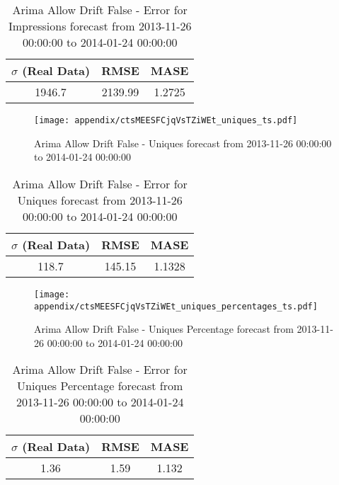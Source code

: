 \begin{table}[H]
\centering
\footnotesize
\begin{tabular}{ccc}
$\sigma$ (Real Data) & RMSE & MASE   \\ \hline
1946.7 & 2139.99 & 1.2725 \\
\end{tabular}

\vspace{0.5cm}

\caption[]{
Arima Allow Drift False - Error for Impressions forecast from 2013-11-26 00:00:00 to 2014-01-24 00:00:00}
\end{table}

\begin{figure}[H] \begin{center} \leavevmode
\texttt{[image: appendix/ctsMEESFCjqVsTZiWEt\_uniques\_ts.pdf]} \caption[]{
Arima Allow Drift False - Uniques forecast from 2013-11-26 00:00:00 to 2014-01-24 00:00:00} \label{fig:appendix/ctsMEESFCjqVsTZiWEt_uniques_ts.pdf} \end{center}
\end{figure}

\begin{table}[H]
\centering
\footnotesize
\begin{tabular}{ccc}
$\sigma$ (Real Data) & RMSE & MASE   \\ \hline
118.7 & 145.15 & 1.1328 \\
\end{tabular}

\vspace{0.5cm}

\caption[]{
Arima Allow Drift False - Error for Uniques forecast from 2013-11-26 00:00:00 to 2014-01-24 00:00:00}
\end{table}

\begin{figure}[H] \begin{center} \leavevmode
\texttt{[image: appendix/ctsMEESFCjqVsTZiWEt\_uniques\_percentages\_ts.pdf]} \caption[]{
Arima Allow Drift False - Uniques Percentage forecast from 2013-11-26 00:00:00 to 2014-01-24 00:00:00} \label{fig:appendix/ctsMEESFCjqVsTZiWEt_uniques_percentages_ts.pdf} \end{center}
\end{figure}

\begin{table}[H]
\centering
\footnotesize
\begin{tabular}{ccc}
$\sigma$ (Real Data) & RMSE & MASE   \\ \hline
1.36 & 1.59 & 1.132 \\
\end{tabular}

\vspace{0.5cm}

\caption[]{
Arima Allow Drift False - Error for Uniques Percentage forecast from 2013-11-26 00:00:00 to 2014-01-24 00:00:00}
\end{table}


